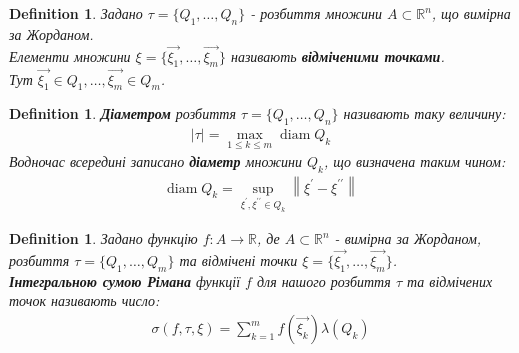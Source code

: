 \documentclass[a4paper, 10pt]{article}
\DeclareMathOperator*\diam{diam}
\theoremstyle{theoremdd}
\theoremstyle{theoremdd}
\newtheorem{definition}[theorem]{Definition}
\theoremstyle{theoremdd}
\theoremstyle{theoremdd}
\theoremstyle{theoremdd}
\theoremstyle{theoremdd}
\theoremstyle{theoremdd}
\theoremstyle{theoremdd}
\newcommand\Norm[1]{\left\lVert#1\right\rVert}
\begin{document}

\begin{definition}
Задано $\tau = \{Q_1,\dots,Q_n\}$ - розбиття множини $A \subset \mathbb{R}^n$, що вимірна за Жорданом.\\
Елементи множини $\xi = \{\vec{\xi_1}, \dots, \vec{\xi_m} \}$ називають \textbf{відміченими точками}.\\
Тут $\vec{\xi_1} \in Q_1, \dots, \vec{\xi_m} \in Q_m$.
\end{definition}

\begin{definition}
\textbf{Діаметром} розбиття $\tau = \{Q_1,\dots,Q_n\}$ називають таку величину:
\begin{align*}
|\tau| = \max_{1 \leq k \leq m} \diam Q_k
\end{align*}
Водночас всередині записано \textbf{діаметр} множини $Q_k$, що визначена таким чином:
\begin{align*}
\diam Q_k = \sup_{\xi^\prime, \xi^{\prime \prime} \in Q_k} \Norm{\xi^\prime - \xi^{\prime \prime}}
\end{align*}
\end{definition}

\begin{definition}
Задано функцію $f: A \to \mathbb{R}$, де $A \subset \mathbb{R}^n$ - вимірна за Жорданом, розбиття $\tau = \{Q_1,\dots,Q_m\}$ та відмічені точки $\xi = \{\vec{\xi_1}, \dots, \vec{\xi_m} \}$.\\
\textbf{Інтегральною сумою Рімана} функції $f$ для нашого розбиття $\tau$ та відмічених точок називають число:
\begin{align*}
\sigma (f, \tau, \xi) = \sum_{k=1}^m f(\vec{\xi_k}) \lambda(Q_k)
\end{align*}
\end{definition}
\end{document}
